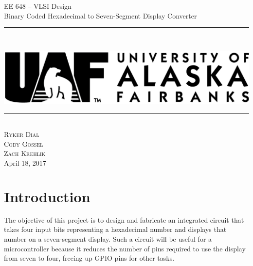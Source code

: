 \documentclass[12pt]{article}
\newcommand{\boldrule}{\rule{\linewidth}{2pt}} %
\begin{document}
\thispagestyle{empty}
\newpage
\vspace*{3cm}
\begin{center}
{\Huge EE 648 -- VLSI Design\\[.5cm]
Binary Coded Hexadecimal to Seven-Segment Display Converter}
\end{center}
\vspace{5mm}
\boldrule\\
\begin{center}
\includegraphics{uaflogo.png}\\[.5cm]
\boldrule\\[3cm]
{\Large
\textsc{Ryker Dial}\\
\textsc{Cody Gossel}\\
\textsc{Zach Krehlik}\\[1cm]
April 18, 2017
}
\end{center}


\newpage

\thispagestyle{empty}
\tableofcontents

\newpage

\setcounter{page}{1}


\section{Introduction}
The objective of this project is to design and fabricate an integrated circuit that takes four input bits representing a hexadecimal number and displays that number on a seven-segment display.
Such a circuit will be useful for a microcontroller because it reduces the number of pins required to use the display from seven to four, freeing up GPIO pins for other tasks.

\end{document}
